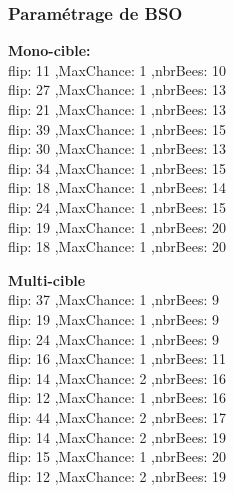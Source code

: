 \subsubsection{Paramétrage de BSO}
\noindent
\begin{minipage}[t]{0.55\textwidth}
	\textbf{Mono-cible:} \\
flip: 11 ,MaxChance: 1 ,nbrBees: 10\\
flip: 27 ,MaxChance: 1 ,nbrBees: 13\\
flip: 21 ,MaxChance: 1 ,nbrBees: 13\\
flip: 39 ,MaxChance: 1 ,nbrBees: 15\\
flip: 30 ,MaxChance: 1 ,nbrBees: 13\\
flip: 34 ,MaxChance: 1 ,nbrBees: 15\\
flip: 18 ,MaxChance: 1 ,nbrBees: 14\\
flip: 24 ,MaxChance: 1 ,nbrBees: 15\\
flip: 19 ,MaxChance: 1 ,nbrBees: 20\\
flip: 18 ,MaxChance: 1 ,nbrBees: 20
	
	
\end{minipage}\hfill
\hspace{0.2cm}
\begin{minipage}[t]{0.55\textwidth}
	\textbf{Multi-cible}\\
flip: 37 ,MaxChance: 1 ,nbrBees: 9\\
flip: 19 ,MaxChance: 1 ,nbrBees: 9\\
flip: 24 ,MaxChance: 1 ,nbrBees: 9\\
flip: 16 ,MaxChance: 1 ,nbrBees: 11\\
flip: 14 ,MaxChance: 2 ,nbrBees: 16\\
flip: 12 ,MaxChance: 1 ,nbrBees: 16\\
flip: 44 ,MaxChance: 2 ,nbrBees: 17\\
flip: 14 ,MaxChance: 2 ,nbrBees: 19\\
flip: 15 ,MaxChance: 1 ,nbrBees: 20\\
flip: 12 ,MaxChance: 2 ,nbrBees: 19
	
\end{minipage}\hfill



